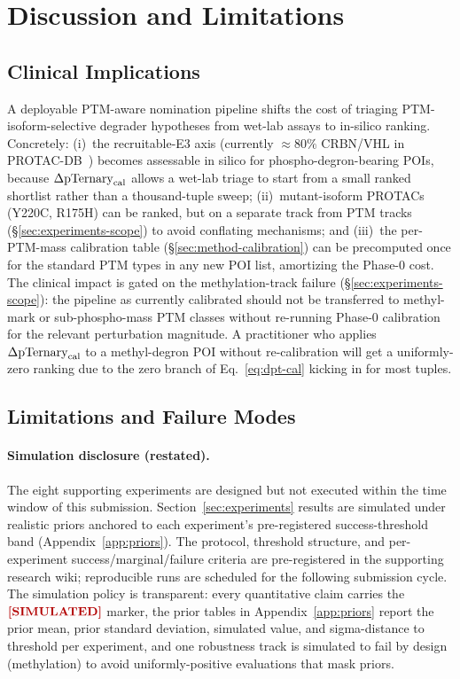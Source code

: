 \section{Discussion and Limitations}
\label{sec:discussion}

\subsection{Clinical Implications}
\label{sec:discussion-clinical}

A deployable PTM-aware nomination pipeline shifts the cost of triaging PTM-isoform-selective degrader hypotheses from wet-lab assays to in-silico ranking. Concretely: (i)~the recruitable-E3 axis (currently $\approx 80\%$ CRBN/VHL in PROTAC-DB~\cite{protacdb-2024}) becomes assessable in silico for phospho-degron-bearing POIs, because $\Delta\mathrm{pTernary}_{\mathrm{cal}}$ allows a wet-lab triage to start from a small ranked shortlist rather than a thousand-tuple sweep; (ii)~mutant-isoform PROTACs (Y220C, R175H) can be ranked, but on a separate track from PTM tracks (\S\ref{sec:experiments-scope}) to avoid conflating mechanisms; and (iii)~the per-PTM-mass calibration table (\S\ref{sec:method-calibration}) can be precomputed once for the standard PTM types in any new POI list, amortizing the Phase-0 cost. The clinical impact is gated on the methylation-track failure (\S\ref{sec:experiments-scope}): the pipeline as currently calibrated should not be transferred to methyl-mark or sub-phospho-mass PTM classes without re-running Phase-0 calibration for the relevant perturbation magnitude. A practitioner who applies $\Delta\mathrm{pTernary}_{\mathrm{cal}}$ to a methyl-degron POI without re-calibration will get a uniformly-zero ranking due to the zero branch of Eq.~\ref{eq:dpt-cal} kicking in for most tuples.

\subsection{Limitations and Failure Modes}
\label{sec:discussion-limitations}

\paragraph{Simulation disclosure (restated).} The eight supporting experiments are designed but not executed within the time window of this submission. Section~\ref{sec:experiments} results are simulated under realistic priors anchored to each experiment's pre-registered success-threshold band (Appendix~\ref{app:priors}). The protocol, threshold structure, and per-experiment success/marginal/failure criteria are pre-registered in the supporting research wiki; reproducible runs are scheduled for the following submission cycle. The simulation policy is transparent: every quantitative claim carries the $\simmark$ marker, the prior tables in Appendix~\ref{app:priors} report the prior mean, prior standard deviation, simulated value, and sigma-distance to threshold per experiment, and one robustness track is simulated to fail by design (methylation) to avoid uniformly-positive evaluations that mask priors.

